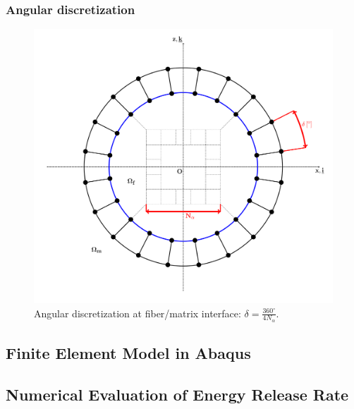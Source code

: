 \documentclass[first,firstsupp,lastsupp,handout,last,hyperref,table]{ETHclass}
\begin{document}
\begin{frame}
\frametitle{Angular discretization}
\vspace{-0.7cm}
\centering
\captionsetup[figure]{font=scriptsize,labelfont=scriptsize}
\begin{figure}[!h]
\centering
\includegraphics[height=0.7\textheight]{mesh-disc-at-interface.pdf}
  \caption{Angular discretization at fiber/matrix interface: $\delta=\frac{360^{\circ}}{4N_{\alpha}}$.}
  \label{fig:angu-discr-def}
\end{figure}
\end{frame}

\subsection[FEM Model]{Finite Element Model in Abaqus}

\subsection[$G_{c}$ Numerical Evaluation]{Numerical Evaluation of Energy Release Rate}
\end{document}
